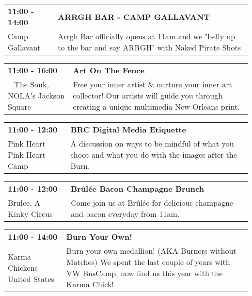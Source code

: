 \begin{tabular}{ p{1in} p{2.2in} }
    \textbf{11:00 - 14:00} & \textbf{ARRGH BAR - CAMP GALLAVANT} \\
    Camp Gallavant \newline  & Arrgh Bar officially opens at 11am and we "belly up to the bar and say ARRGH" with Naked Pirate Shots \\
    \hline 
\end{tabular}
    
\begin{tabular}{ p{1in} p{2.2in} }
    \textbf{11:00 - 16:00} & \textbf{Art On The Fence} \\
    ~ \newline The Souk, NOLA's Jackson Square  & Free your inner artist \& nurture your inner art collector! Our artists will guide you through creating a unique multimedia New Orleans print. \\
    \hline 
\end{tabular}
    
\begin{tabular}{ p{1in} p{2.2in} }
    \textbf{11:00 - 12:30} & \textbf{BRC Digital Media Etiquette} \\
    Pink Heart \newline Pink Heart Camp & A discussion on ways to be mindful of what you shoot and what you do with the images after the Burn. \\
    \hline 
\end{tabular}
    
\begin{tabular}{ p{1in} p{2.2in} }
    \textbf{11:00 - 12:00} & \textbf{Br\^ul\'ee Bacon Champagne Brunch} \\
    Brulee, A Kinky Circus \newline  & Come join us at Br\^ul\'ee for delicious champagne and bacon everyday from 11am. \\
    \hline 
\end{tabular}
    
\begin{tabular}{ p{1in} p{2.2in} }
    \textbf{11:00 - 14:00} & \textbf{Burn Your Own!} \\
    Karma Chickens \newline United States & Burn your own medallion! (AKA Burners without Matches) We spent the last couple of years with VW BusCamp, now find us this year with the Karma Chick! \\
    \hline 
\end{tabular}
    
